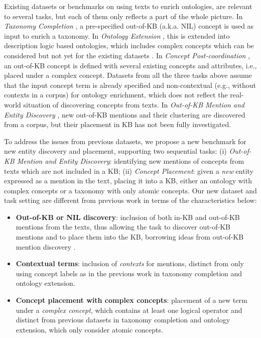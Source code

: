 \documentclass[sigconf]{acmart}
\begin{document}
Existing datasets or benchmarks on using texts to enrich ontologies, are relevant to several tasks, but each of them only reflects a part of the whole picture. In \textit{Taxonomy Completion} \cite{Shen2020TaxoExpan,jurgens-pilehvar-2016-semeval}, a pre-specified out-of-KB (a.k.a. NIL) concept is used as input to enrich a taxonomy. In \textit{Ontology Extension} \cite{glauer2022interpretable}, this is extended into description logic based ontologies, which includes complex concepts which can be considered \cite{chen2023contextual,yuan2023ontolama} but not yet for the existing datasets \cite{glauer2022interpretable}. In \textit{Concept Post-coordination} \cite{kate2020,castell2023postcoordination}, an out-of-KB concept is defined with several existing concepts and attributes, i.e., placed under a complex concept. Datasets from all the three tasks above assume that the input concept term is already specified and non-contextual (e.g., without contexts in a corpus) for ontology enrichment, which does not reflect the real-world situation of discovering concepts from texts.  In \textit{Out-of-KB Mention and Entity Discovery} \cite{Iurshina2022nilk,heist2023nastylinker,dong2023NIL}, new out-of-KB mentions and their clustering are discovered from a corpus, but their placement in KB has not been fully investigated.

To address the issues from previous datasets, we propose a new benchmark for new entity discovery and placement, supporting two sequential tasks: (i) \textit{Out-of-KB Mention and Entity Discovery}: identifying new mentions of concepts from texts which are not included in a KB; (ii) \textit{Concept Placement}: given a \textit{new} entity expressed as a mention in the text, placing it into a KB, either an ontology with complex concepts or a taxonomy with only atomic concepts. Our new dataset and task setting are different from previous work in terms of the characteristics below:

\begin{itemize}
\item \textbf{Out-of-KB or NIL discovery}: inclusion of both in-KB and out-of-KB mentions from the texts, thus allowing the task to discover out-of-KB mentions and to place them into the KB, borrowing ideas from out-of-KB mention discovery \cite{dong2023NIL}.
\item \textbf{Contextual terms}: inclusion of \textit{contexts} for mentions, distinct from only using concept labels as in the previous work in taxonomy completion and ontology extension.
\item \textbf{Concept placement with complex concepts}: placement of a new term under a \textit{complex concept}, which contains at least one logical operator and distinct from previous datasets in taxonomy completion and ontology extension, which only consider atomic concepts.
\end{itemize}
\end{document}
